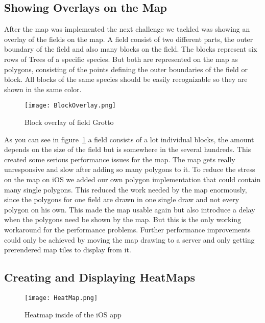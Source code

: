 \subsection{Showing Overlays on the Map}

After the map was implemented the next challenge we tackled was showing an overlay of the fields on the map. A field consist of two different parts, the outer boundary of the field and also many blocks on the field. The blocks represent six rows of Trees of a specific species. But both are represented on the map as polygons, consisting of the points defining the outer boundaries of the field or block. All blocks of the same species should be easily recognizable so they are shown in the same color. 

\begin{figure}[h]
		\centering
		\texttt{[image: BlockOverlay.png]}
		\caption{Block overlay of field Grotto}\label{blockoverlay}
\end{figure}

As you can see in figure~\ref{blockoverlay} a field consists of a lot individual blocks, the amount depends on the size of the field but is somewhere in the several hundreds. This created some serious performance issues for the map. The map gets really unresponsive and slow after adding so many \glspl{polygon} to it. To reduce the stress on the map on iOS we added our own \gls{polygon} implementation that could contain many single \glspl{polygon}. This reduced the work needed by the map enormously, since the polygons for one field are drawn in one single draw and not every \gls{polygon} on his own. This made the map usable again but also introduce a delay when the polygons need be shown by the map. But this is the only working workaround for the performance problems. Further performance improvements could only be achieved by moving the map drawing to a server and only getting prerendered map tiles to display from it.

\subsection{Creating and Displaying HeatMaps}

\begin{figure}[h]
		\centering
		\texttt{[image: HeatMap.png]}
		\caption{Heatmap inside of the iOS app}\label{heatmap}

\end{figure}

